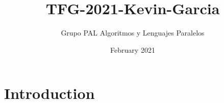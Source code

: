 \documentclass{article}
\title{TFG-2021-Kevin-Garcia}
\author{Grupo PAL Algoritmos y Lenguajes Paralelos}
\date{February 2021}
\begin{document}
\maketitle

\section{Introduction}
\end{document}
